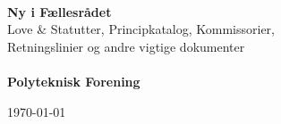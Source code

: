 \begin{titlepage}
\centering \parindent=0pt
 \HRule\\[1cm]\Huge
\textbf{Ny i Fællesrådet} \\[0.7cm]
\large Love \& Statutter, Principkatalog, Kommissorier, \\Retningslinier og andre vigtige dokumenter\\[1cm]
\HRule\\[4cm]  
\Large \textbf{Polyteknisk Forening}

 \normalsize %
\begin{flushleft}
\today \end{flushleft}

\end{titlepage}